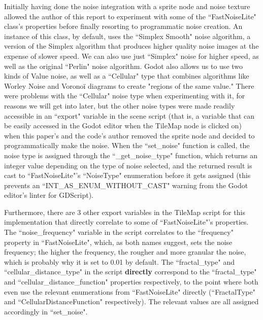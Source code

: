 Initially having done the noise integration with a sprite node and noise texture allowed the author of this report to experiment with some of the ``FastNoiseLite" class's properties before finally resorting to programmatic noise creation. An instance of this class, by default, uses the ``Simplex Smooth" noise algorithm, a version of the Simplex algorithm that produces higher quality noise images at the expense of slower speed.\cite{fastnoiselitedocs} We can also use just ``Simplex" noise for higher speed, as well as the original ``Perlin" noise algorithm.\cite{fastnoiselitedocs} Godot also allows us to use two kinds of Value noise, as well as a ``Cellular" type that combines algorithms like Worley Noise and Voronoï diagrams to create "regions of the same value."\cite{fastnoiselitedocs} There were problems with the ``Cellular" noise type when experimenting with it, for reasons we will get into later, but the other noise types were made readily accessible in an ``export" variable in the scene script (that is, a variable that can be easily accessed in the Godot editor when the TileMap node is clicked on) when this paper's and the code's author removed the sprite node and decided to programmatically make the noise. When the ``set\_noise" function is called, the noise type is assigned through the ``\_get\_noise\_type" function, which returns an integer value depending on the type of noise selected, and the returned result is cast to ``FastNoiseLite"'s ``NoiseType" enumeration\cite{fastnoiselitedocs} before it gets assigned (this prevents an ``INT\_AS\_ENUM\_WITHOUT\_CAST" warning from the Godot editor's linter for GDScript\cite{projectsettingsdocs}).

Furthermore, there are 3 other export variables in the TileMap script for this implementation that directly correlate to some of ``FastNoiseLite"'s properties. The ``noise\_frequency" variable in the script correlates to the ``frequency" property in ``FastNoiseLite", which, as both names suggest, sets the noise frequency; the higher the frequency, the rougher and more granular the noise\cite{fastnoiselitedocs}, which is probably why it is set to 0.01 by default.\cite{fastnoiselitedocs}  The ``fractal\_type" and ``cellular\_distance\_type" in the script \textbf{directly} correspond to the ``fractal\_type" and ``cellular\_distance\_function" properties respectively, to the point where both even use the relevant enumerations from ``FastNoiseLite" directly (``FractalType" and ``CellularDistanceFunction" respectively).\cite{fastnoiselitedocs} The relevant values are all assigned accordingly in ``set\_noise".

